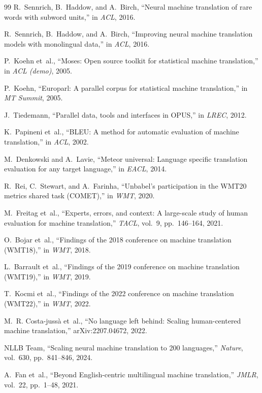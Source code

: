 \begin{thebibliography}{99}
R.~Sennrich, B.~Haddow, and A.~Birch, ``Neural machine translation of rare words
with subword units,'' in \emph{ACL}, 2016.

R.~Sennrich, B.~Haddow, and A.~Birch, ``Improving neural machine translation
models with monolingual data,'' in \emph{ACL}, 2016.

P.~Koehn et~al., ``Moses: Open source toolkit for statistical machine
translation,'' in \emph{ACL (demo)}, 2005.

P.~Koehn, ``Europarl: A parallel corpus for statistical machine translation,''
in \emph{MT Summit}, 2005.

J.~Tiedemann, ``Parallel data, tools and interfaces in OPUS,'' in \emph{LREC},
2012.

K.~Papineni et~al., ``BLEU: A method for automatic evaluation of machine
translation,'' in \emph{ACL}, 2002.

M.~Denkowski and A.~Lavie, ``Meteor universal: Language specific translation
evaluation for any target language,'' in \emph{EACL}, 2014.

R.~Rei, C.~Stewart, and A.~Farinha, ``Unbabel's participation in the WMT20
metrics shared task (COMET),'' in \emph{WMT}, 2020.

M.~Freitag et~al., ``Experts, errors, and context: A large-scale study of human
evaluation for machine translation,'' \emph{TACL}, vol.~9, pp.~146--164, 2021.

O.~Bojar et~al., ``Findings of the 2018 conference on machine translation
(WMT18),'' in \emph{WMT}, 2018.

L.~Barrault et~al., ``Findings of the 2019 conference on machine translation
(WMT19),'' in \emph{WMT}, 2019.

T.~Kocmi et~al., ``Findings of the 2022 conference on machine translation
(WMT22),'' in \emph{WMT}, 2022.

M.~R. Costa-juss\`a et~al., ``No language left behind: Scaling human-centered
machine translation,'' arXiv:2207.04672, 2022.

NLLB Team, ``Scaling neural machine translation to 200 languages,''
\emph{Nature}, vol.~630, pp.~841--846, 2024.

A.~Fan et~al., ``Beyond English-centric multilingual machine translation,''
\emph{JMLR}, vol.~22, pp.~1--48, 2021.


\end{thebibliography}
